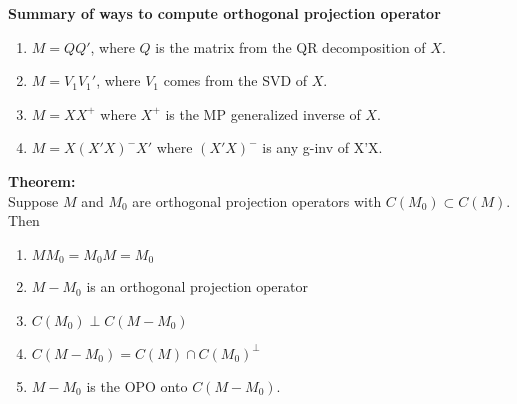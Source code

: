 \documentclass[12pt]{article}
\numberwithin{equation}{section}
\begin{document}
\textbf{Summary of ways to compute orthogonal projection operator}
\begin{enumerate}
  \item $M = QQ'$, where $Q$ is the matrix from the QR decomposition of $X$.
  \item $M = V_1 V_1'$, where $V_1$ comes from the SVD of $X$.
  \item $M = XX^+$ where $X^+$ is the MP generalized inverse of $X$.
  \item $M = X(X'X)^{-}X'$ where $(X'X)^{-}$ is any g-inv of X'X.
\end{enumerate}

\textbf{Theorem:} \\
Suppose $M$ and $M_0$ are orthogonal projection operators with $C(M_0) \subset C(M)$. Then
\begin{enumerate}
  \item $MM_0 = M_0 M = M_0$
  \item $M - M_0$ is an orthogonal projection operator
  \item $C(M_0) \perp C(M - M_0)$
  \item $C(M - M_0) = C(M) \cap C(M_0)^{\perp}$
  \item $M - M_0$ is the OPO onto $C(M - M_0)$.
\end{enumerate}
\end{document}
